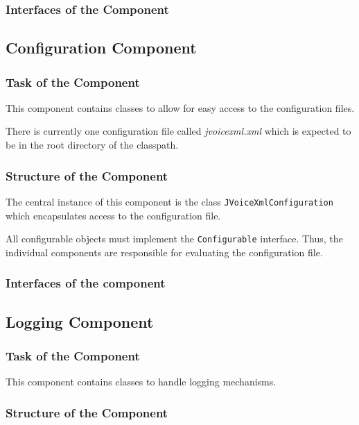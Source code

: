 \documentclass[11pt,a4paper]{article}
\begin{document}
\subsubsection{Interfaces of the Component}

\subsection{Configuration Component}
\label{sec:conf-comp}

\subsubsection{Task of the Component}

This component contains classes to allow for easy access to the configuration
files.

There is currently one configuration file called \emph{jvoicexml.xml}
which is expected to be in the root directory of the classpath.

\subsubsection{Structure of the Component}

The central instance of this component is the class
\texttt{JVoiceXml\-Configurat\-ion} which encapsulates access to the
configuration file.

All configurable objects must implement the \texttt{Configurable}
interface. Thus, the individual components are responsible for
evaluating the configuration file.

\subsubsection{Interfaces of the component}

\subsection{Logging Component}
\label{sec:logging-component}

\subsubsection{Task of the Component}

This component contains classes to handle logging mechanisms.

\subsubsection{Structure of the Component}
\end{document}
